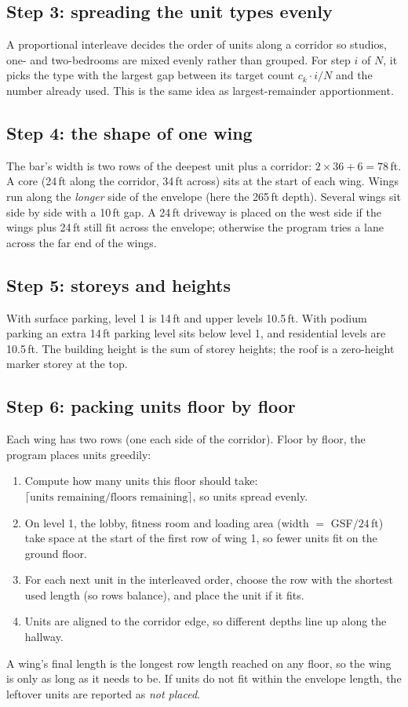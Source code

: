\documentclass[11pt]{article}
\begin{document}
\subsection{Step 3: spreading the unit types evenly}
A proportional interleave decides the order of units along a corridor so studios, one- and two-bedrooms are mixed evenly rather than grouped. For step $i$ of $N$, it
picks the type with the largest gap between its target count $c_k\cdot i/N$ and the number already used. This is the same idea as largest-remainder apportionment.

\subsection{Step 4: the shape of one wing}
The bar's width is two rows of the deepest unit plus a corridor: $2\times 36 + 6 = 78$\,ft. A core (24\,ft along the corridor, 34\,ft across) sits at the
start of each wing. Wings run along the \emph{longer} side of the envelope (here the 265\,ft depth). Several wings sit side by side with a 10\,ft gap. A 24\,ft driveway
is placed on the west side if the wings plus 24\,ft still fit across the envelope; otherwise the program tries a lane across the far end of the wings.

\subsection{Step 5: storeys and heights}
With surface parking, level 1 is 14\,ft and upper levels 10.5\,ft. With podium parking an extra 14\,ft parking level sits below level 1, and residential levels are 10.5\,ft.
The building height is the sum of storey heights; the roof is a zero-height marker storey at the top.

\subsection{Step 6: packing units floor by floor}
Each wing has two rows (one each side of the corridor). Floor by floor, the program places units greedily:
\begin{enumerate}[nosep]
\item Compute how many units this floor should take: $\lceil \text{units remaining} / \text{floors remaining}\rceil$, so units spread evenly.
\item On level 1, the lobby, fitness room and loading area (width $=$ GSF$/24$\,ft) take space at the start of the first row of wing 1, so fewer units fit on the ground floor.
\item For each next unit in the interleaved order, choose the row with the shortest used length (so rows balance), and place the unit if it fits.
\item Units are aligned to the corridor edge, so different depths line up along the hallway.
\end{enumerate}
A wing's final length is the longest row length reached on any floor, so the wing is only as long as it needs to be. If units do not fit within the envelope length, the leftover
units are reported as \emph{not placed}.
\end{document}
